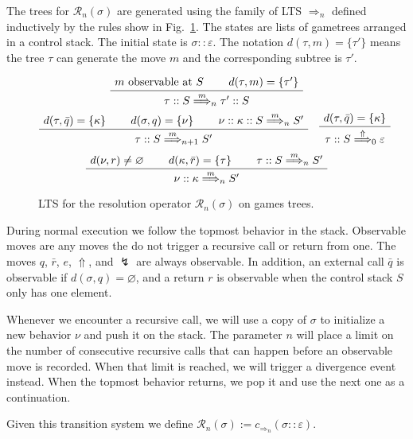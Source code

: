 \documentclass{article}
\newcommand{\kw}[1]{{\mathsf{#1}}}
\begin{document}
The trees for $\mathcal{R}_n(\sigma)$ are generated
using the family of LTS $\Rightarrow_n$ defined inductively
by the rules show in Fig.~\ref{fig:res}.
The states are lists of gametrees arranged in a control stack.
The initial state is $\sigma :: \varepsilon$.
The notation $d(\tau, m) = \{\tau'\}$ means
the tree $\tau$ can generate the move $m$
and the corresponding subtree is $\tau'$.

\begin{figure}
\[
  \AxiomC{$m \mbox{ observable at } S$}
  \AxiomC{$d(\tau, m) = \{ \tau' \}$}
  \BinaryInfC{$\tau :: S \stackrel{m}{\Longrightarrow}_n \tau' :: S$}
  \DisplayProof
\]
\[
  \AxiomC{$d(\tau, \bar{q}) = \{\kappa\}$}
  \AxiomC{$d(\sigma, q) = \{\nu\}$}
  \AxiomC{$\nu :: \kappa :: S \stackrel{m}{\Longrightarrow}_n S'$}
  \TrinaryInfC{$\tau :: S \stackrel{m}{\Longrightarrow}_{n+1} S'$}
  \DisplayProof
  \quad
  \AxiomC{$d(\tau, \bar{q}) = \{\kappa\}$}
  \UnaryInfC{$\tau :: S \stackrel{\Uparrow}{\Longrightarrow}_0 \varepsilon$}
  \DisplayProof
\]
\vspace{.5em}
\[
  \AxiomC{$d(\nu, r) \ne \varnothing$}
  \AxiomC{$d(\kappa, \bar{r}) = \{\tau\}$}
  \AxiomC{$\tau :: S \stackrel{m}{\Longrightarrow}_n S'$}
  \TrinaryInfC{$\nu :: \kappa \stackrel{m}{\Longrightarrow}_n S'$}
  \DisplayProof
\]
\caption{LTS for the resolution operator
  $\mathcal{R}_n(\sigma)$ on games trees.}
\label{fig:res}
\end{figure}

During normal execution we follow the topmost behavior in the stack.
Observable moves are any moves the do not trigger a recursive call
or return from one.
The moves $q$, $\bar{r}$, $e$, $\Uparrow$, and $\lightning$
are always observable.
In addition,
an external call $\bar{q}$
is observable if $d(\sigma, q) = \varnothing$,
and a return $r$
is observable when the control stack $S$ only has one element.

Whenever we encounter a recursive call,
we will use a copy of $\sigma$
to initialize a new behavior $\nu$ and push it on the stack.
The parameter $n$ will place a limit on
the number of consecutive recursive calls that can happen
before an observable move is recorded.
When that limit is reached,
we will trigger a divergence event instead.
When the topmost behavior returns,
we pop it and use the next one as a continuation.

Given this transition system we define
$\mathcal{R}_n(\sigma) := c_{\Rightarrow_n}(\sigma :: \varepsilon)$.




\end{document}
